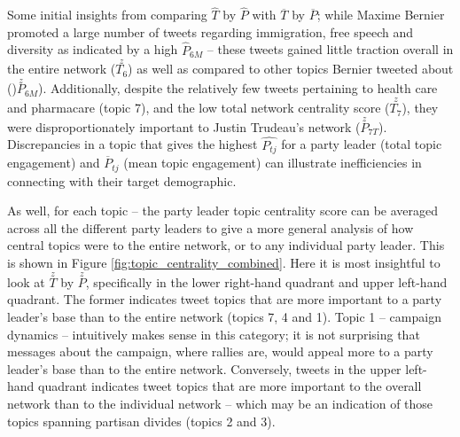 Some initial insights from comparing \textbf{$\hat{T}$} by \textbf{$\hat{P}$}
with \textbf{$\overline{T}$} by \textbf{$\overline{P}$}; while Maxime Bernier
promoted a large number of tweets regarding immigration, free speech and
diversity as indicated by a high $\hat{P}_{6M}$ -- these tweets gained little
traction overall in the entire network ($\stackrel{z}{T_{6}}$) as well as
compared to other topics Bernier tweeted about ()$\stackrel{z}{P}_{6M}$).
Additionally, despite the relatively few tweets pertaining to health care and
pharmacare (topic 7), and the low total network centrality score
($\stackrel{z}{T_{7}}$), they were disproportionately important to Justin
Trudeau's network ($\stackrel{z}{P}_{7T}$). Discrepancies in a topic that gives
the highest $\hat{P_{tj}}$ for a party leader (total topic engagement) and
$\overline{P}_{tj}$  (mean topic engagement) can illustrate inefficiencies in
connecting with their target demographic.

As well, for each topic -- the party leader topic centrality score can be
averaged across all the different party leaders to give a more general analysis
of how central topics were to the entire network, or to any individual party
leader. This is shown in Figure \ref{fig:topic_centrality_combined}. Here it is
most insightful to look at \textbf{$\stackrel{z}{T}$} by
\textbf{$\stackrel{z}{P}$}, specifically in the lower right-hand quadrant and
upper left-hand quadrant. The former indicates tweet topics that are more
important to a party leader's base than to the entire network (topics 7, 4 and
1). Topic 1 -- campaign dynamics -- intuitively makes sense in this category; it
is not surprising that messages about the campaign, where rallies are, \etc
would appeal more to a party leader's base than to the entire network.
Conversely, tweets in the upper left-hand quadrant indicates tweet topics that
are more important to the overall network than to the individual network --
which may be an indication of those topics spanning partisan divides (topics 2
and 3). 

